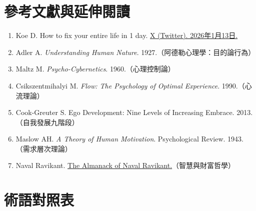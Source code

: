 \documentclass[12pt,a4paper]{article}
\begin{document}
\vspace{0.5cm}

\begin{center}
\end{center}

\section{參考文獻與延伸閱讀}

\begin{enumerate}
    \item Koe D. How to fix your entire life in 1 day. \href{https://x.com/thedankoe/status/2010751592346030461}{X (Twitter). 2026年1月13日.}

    \item Adler A. \textit{Understanding Human Nature}. 1927.（阿德勒心理學：目的論行為）

    \item Maltz M. \textit{Psycho-Cybernetics}. 1960.（心理控制論）

    \item Csikszentmihalyi M. \textit{Flow: The Psychology of Optimal Experience}. 1990.（心流理論）

    \item Cook-Greuter S. Ego Development: Nine Levels of Increasing Embrace. 2013.（自我發展九階段）

    \item Maslow AH. \textit{A Theory of Human Motivation}. Psychological Review. 1943.（需求層次理論）

    \item Naval Ravikant. \href{https://nav.al/}{The Almanack of Naval Ravikant.}（智慧與財富哲學）
\end{enumerate}

\section{術語對照表}
\end{document}
